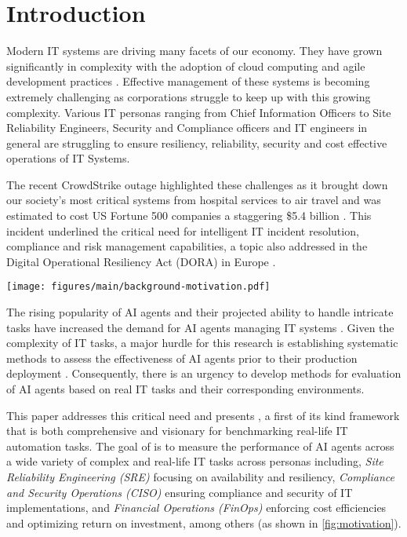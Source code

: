 \section{Introduction}
\label{sec:intro}
Modern IT systems are driving many facets of our economy. They have grown significantly in complexity with the adoption of cloud computing and agile development practices \cite{ITComplexity2022hbr, finops2024}. Effective management of these systems is becoming extremely challenging as corporations struggle to keep up with this growing complexity. Various IT personas ranging from Chief Information Officers to Site Reliability Engineers, Security and Compliance officers and IT engineers in general are struggling to ensure resiliency, reliability, security and cost effective operations of IT Systems.


The recent CrowdStrike outage highlighted these challenges as it brought down our society's most critical systems from hospital services to air travel and was estimated to cost US Fortune 500 companies a staggering \$5.4 billion \cite{csincident2024}. This incident underlined the critical need for intelligent IT incident resolution, compliance and risk management capabilities, a topic also addressed in the Digital Operational Resiliency Act (DORA) in Europe \cite{dora}. 

\begin{figure*}[ht]
    \centering
    \texttt{[image: figures/main/background-motivation.pdf]}
    \caption{Sample personas and IT tasks. Bell icon represents event-triggered tasks. Information icon represents other tasks such as data analysis, preventive maintenance tasks, or continuous optimization.}
    \label{fig:motivation}
\end{figure*}

The rising popularity of AI agents and their projected ability to handle intricate tasks have increased the demand for AI agents managing IT systems \cite{WIRE19-2024, IDC2024, pujar2023automatedcodegenerationinformation}. Given the complexity of IT tasks, a major hurdle for this research is establishing systematic methods to assess the effectiveness of AI agents prior to their production deployment \cite{Bogin2024SUPEREA, kapoor2024aiagentsmatter}. Consequently, there is an urgency to develop methods for evaluation of AI agents based on real IT tasks and their corresponding environments. %


This paper addresses this critical need and presents \bench, a first of its kind framework that is both comprehensive and visionary for benchmarking real-life IT automation tasks. The goal of \bench is to measure the performance of AI agents across a wide variety of complex and real-life IT tasks across personas including, \textit{Site Reliability Engineering (SRE)} focusing on availability and resiliency, \textit{Compliance and Security Operations (CISO)} ensuring compliance and security of IT implementations, and \textit{Financial Operations (FinOps)} enforcing cost efficiencies and optimizing return on investment, among others (as shown in \cref{fig:motivation}).

